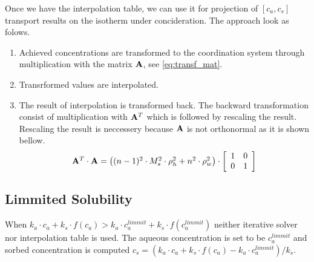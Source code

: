 Once we have the interpolation table, we can use it for projection of ${[c_a,c_s]}$ transport results on the isotherm under concideration. The approach look as folows.
\begin{enumerate}
 \item Achieved concentrations are transformed to the coordination system through multiplication with the matrix ${\bf A}$, see \ref{eq:transf_mat}.
 \item Transrformed values are interpolated.
 \item The result of interpolation is transformed back. The backward transformation consist of multiplication with ${\bf A}^T$ which is followed by rescaling the result. Rescaling the result is neccessery because  ${\bf A}$ is not orthonormal as it is shown bellow.
 \[
 \begin{array}{l}
 {\bf A}^T\cdot{\bf A} =
  \left((n - 1)^2\cdot M_s^2\cdot \rho_h^2 + n^2\cdot \rho_w^2\right)\cdot\left[\begin{array}{cc}
    1 & 0\\
    0 & 1
  \end{array}\right]
  \end{array}
 \]
\end{enumerate}


\subsection{Limmited Solubility}\label{subsec:lim_solub}
When $k_a\cdot c_a + k_s\cdot f(c_a) > k_a\cdot c_a^{limmit} + k_s\cdot f(c_a^{limmit})$ neither iterative solver nor interpolation table is used. The aqueous concentration is set to be $c_a^{limmit}$ and sorbed concentration is computed $c_s = (k_a\cdot c_a + k_s\cdot f(c_a) - k_a\cdot c_a^{limmit})/k_s$.